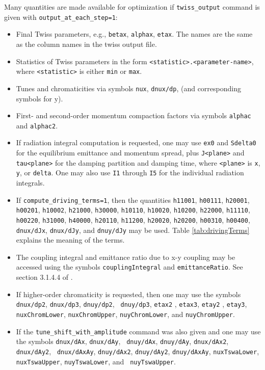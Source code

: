 \documentclass[11pt]{article}
\begin{document}
\begin{itemize}
Many quantities are made available for optimization if \verb|twiss_output| command is given
with \verb|output_at_each_step=1|:
\begin{itemize} 
\item Final Twiss parameters, e.g., \verb|betax|, \verb|alphax|, \verb|etax|.  The names
are the same as the column names in the twiss output file.
\item Statistics of Twiss parameters in the form \verb|<statistic>.<parameter-name>|,
where \verb|<statistic>| is either \verb|min| or \verb|max|.
\item Tunes and chromaticities via symbols \verb|nux|, \verb|dnux/dp|, (and corresponding
symbols for y).
\item First- and second-order momentum compaction factors via symbols \verb|alphac| and \verb|alphac2|.  
\item If radiation integral computation is requested,  one may use \verb|ex0| and \verb|Sdelta0| for
the equilibrium emittance and momentum spread, plus \verb|J<plane>|
and \verb|tau<plane>| for the damping partition and damping time,
where \verb|<plane>| is \verb|x|, \verb|y|, or \verb|delta|.  One may also use
\verb|I1| through \verb|I5| for the individual radiation integrals.
\item If \verb|compute_driving_terms=1|, then the quantities
{\tt h11001}, {\tt h00111}, {\tt h20001}, {\tt h00201}, {\tt h10002}, {\tt h21000}, {\tt h30000}, {\tt h10110}, {\tt h10020},
{\tt h10200}, {\tt h22000}, {\tt h11110}, {\tt h00220}, {\tt h31000}, {\tt h40000}, {\tt h20110}, {\tt h11200}, {\tt h20020},
{\tt h20200}, {\tt h00310}, {\tt h00400}, {\tt dnux/dJx}, {\tt dnux/dJy},  and {\tt dnuy/dJy} 
may be used.  Table \ref{tab:drivingTerms} explains the meaning of the terms.
\item The coupling integral and emittance ratio due to x-y coupling may
be accessed using the symbols \verb|couplingIntegral| and
\verb|emittanceRatio|.  See section 3.1.4.4 of \cite{HAPE}.
\item If higher-order chromaticity is requested, then one may use the
  symbols {\tt dnux/dp2}, {\tt dnux/dp3}, {\tt dnuy/dp2}, {\tt
    dnuy/dp3}, {\tt etax2} , {\tt etax3}, {\tt etay2} , {\tt etay3},
  {\tt nuxChromLower}, {\tt nuxChromUpper}, {\tt nuyChromLower}, and
  {\tt nuyChromUpper}.
\item If the \verb|tune_shift_with_amplitude| command was also given
  and one may use the symbols {\tt dnux/dAx}, {\tt dnux/dAy}, {\tt
    dnuy/dAx}, {\tt dnuy/dAy}, {\tt dnux/dAx2}, {\tt dnux/dAy2}, {\tt
    dnux/dAxAy}, {\tt dnuy/dAx2}, {\tt dnuy/dAy2}, {\tt dnuy/dAxAy},
  {\tt nuxTswaLower}, {\tt nuxTswaUpper}, {\tt nuyTswaLower}, and {\tt
    nuyTswaUpper}.


\end{itemize}
\end{itemize}
\end{document}
